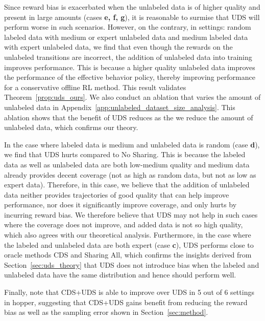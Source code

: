 Since reward bias is exacerbated when the unlabeled data is of higher quality and present in large amounts (cases \textbf{e, f, g}), it is reasonable to surmise that UDS will perform worse in such scenarios. However, on the contrary, in settings: random labeled data with medium or expert unlabeled data and medium labeled data with expert unlabeled data, we find that even though the rewards on the unlabeled transitions are incorrect, the addition of unlabeled data into training improves performance. This is because a higher quality unlabeled data improves the performance of the effective behavior policy, thereby improving performance for a conservative offline RL method. This result validates Theorem~\ref{prop:uds_ours}. 
We also conduct an ablation that varies the amount of unlabeled data in Appendix~\ref{app:unlabeled_dataset_size_analysis}. This ablation shows that the benefit of UDS reduces as the we reduce the amount of unlabeled data, which confirms our theory.

In the case where labeled data is medium and unlabeled data is random (case \textbf{d}), we find that UDS hurts compared to No Sharing. This is because the labeled data as well as unlabeled data are both low-medium quality and medium data already provides decent coverage (not as high as random data, but not as low as expert data). Therefore, in this case, we believe that the addition of unlabeled data neither provides trajectories of good quality that can help improve performance, nor does it significantly improve coverage, and only hurts by incurring reward bias. We therefore believe that UDS may not help in such cases where the coverage does not improve, and added data is not so high quality, which also agrees with our theoretical analysis. Furthermore, in the case where the labeled and unlabeled data are both expert (case \textbf{c}), UDS performs close to oracle methods CDS and Sharing All, which confirms the insights derived from Section~\ref{sec:uds_theory} that UDS does not introduce bias when the labeled and unlabeled data have the same distribution and hence should perform well.

Finally, note that CDS+UDS is able to improve over UDS in 5 out of 6 settings in hopper, suggesting that CDS+UDS gains benefit from reducing the reward bias as well as the sampling error shown in Section~\ref{sec:method}.



